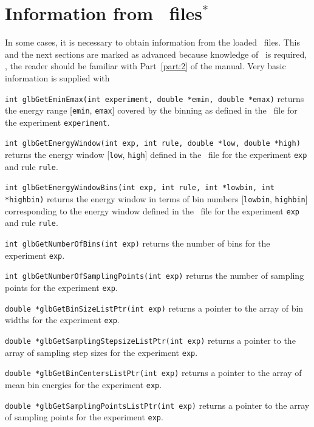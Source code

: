 \section{Information from \AEDL\ files$^*$}
\label{sec:aedl_names}

In some cases, it is necessary to obtain information from the loaded \AEDL\
files. This and the next sections are marked as advanced because knowledge of \AEDL\ is
required, \ie,  the reader should be familiar with Part~\ref{part:2} of the manual.
%
Very basic information is supplied with
\begin{function}
{\tt int glbGetEminEmax(int experiment, double *emin, double *emax)} returns the
energy range [{\tt emin}, {\tt emax}] covered by the binning as defined in the \AEDL\ file for the experiment
{\tt experiment}.
\end{function}
\begin{function}
{\tt int glbGetEnergyWindow(int exp, int rule, double *low, double *high)} returns the
energy window [{\tt low}, {\tt high}] defined in the \AEDL\ file for the experiment
{\tt exp} and rule {\tt rule}.
\end{function}
\begin{function}
{\tt int glbGetEnergyWindowBins(int exp, int rule, int *lowbin, int *highbin)} returns the
energy window in terms of bin numbers [{\tt lowbin}, {\tt highbin}] corresponding to the energy window defined in the \AEDL\ file for the experiment {\tt exp} and rule {\tt rule}.
\end{function}
\begin{function}
{\tt int glbGetNumberOfBins(int exp)} returns the number of bins for the experiment {\tt exp}.
\end{function}
\begin{function}
{\tt int glbGetNumberOfSamplingPoints(int exp)} returns the number of sampling points for the experiment {\tt exp}.
\end{function}
\begin{function}
{\tt double *glbGetBinSizeListPtr(int exp)} returns a pointer to the array of bin widths
for the experiment {\tt exp}.
\end{function}
\begin{function}
{\tt double *glbGetSamplingStepsizeListPtr(int exp)} returns a pointer to the array of
sampling step sizes for the experiment {\tt exp}.
\end{function}
\begin{function}
{\tt double *glbGetBinCentersListPtr(int exp)} returns a pointer to the array of
mean bin energies for the experiment {\tt exp}.
\end{function}
\begin{function}
{\tt double *glbGetSamplingPointsListPtr(int exp)} returns a pointer to the array of
sampling points for the experiment {\tt exp}.
\end{function}

